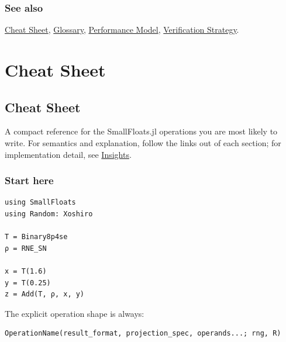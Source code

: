 \subsection{See also}



\label{292862844209942199-dup25}{}


\href{help\_\allowbreak{}cheat\_\allowbreak{}sheet.md}{Cheat Sheet}, \href{help\_\allowbreak{}glossary.md}{Glossary}, \href{concept\_\allowbreak{}performance.md}{Performance Model}, \href{internals\_\allowbreak{}verification.md}{Verification Strategy}.



\chapter{Cheat Sheet}


\section{Cheat Sheet}



\label{17671780375889550826}{}


A compact reference for the SmallFloats.jl operations you are most likely to write. For semantics and explanation, follow the links out of each section; for implementation detail, see \href{internals\_\allowbreak{}architecture.md}{Insights}.



\subsection{Start here}



\label{11995297219376789591}{}



\begin{verbatim}
using SmallFloats
using Random: Xoshiro

T = Binary8p4se
ρ = RNE_SN

x = T(1.6)
y = T(0.25)
z = Add(T, ρ, x, y)
\end{verbatim}



The explicit operation shape is always:




\nopagebreak[4]
\begin{verbatim}
OperationName(result_format, projection_spec, operands...; rng, R)
\end{verbatim}



